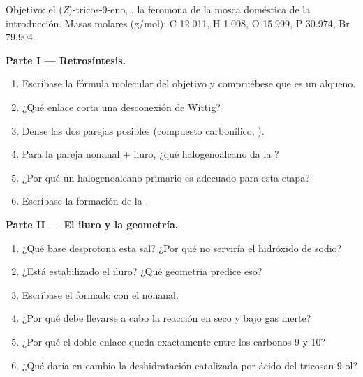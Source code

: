 \begin{problem}
\label{pb:b2:wittig:1}
Objetivo: el (\textit{Z})-tricos-9-eno, , la feromona de la mosca doméstica de la
introducción. Masas molares (\unit{g/mol}): C 12.011, H 1.008, O 15.999, P 30.974, Br 79.904.

\medskip
\noindent\textbf{Parte I --- Retrosíntesis.}
\begin{enumerate}
  \item Escríbase la fórmula molecular del objetivo y compruébese que es un alqueno.
  \item ¿Qué enlace corta una desconexión de Wittig?
  \item Dense las dos parejas posibles (compuesto carbonílico, ).
  \item Para la pareja nonanal + iluro, ¿qué halogenoalcano da la ?
  \item ¿Por qué un halogenoalcano primario es adecuado para esta etapa?
  \item Escríbase la formación de la .
\end{enumerate}

\medskip
\noindent\textbf{Parte II --- El iluro y la geometría.}
\begin{enumerate}[resume]
  \item ¿Qué base desprotona esta sal? ¿Por qué no serviría el hidróxido de sodio?
  \item ¿Está estabilizado el iluro? ¿Qué geometría predice eso?
  \item Escríbase el  formado con el nonanal.
  \item ¿Por qué debe llevarse a cabo la reacción en seco y bajo gas inerte?
  \item ¿Por qué el doble enlace queda exactamente entre los carbonos 9 y 10?
  \item ¿Qué daría en cambio la deshidratación catalizada por ácido del tricosan-9-ol?
\end{enumerate}


\end{problem}
